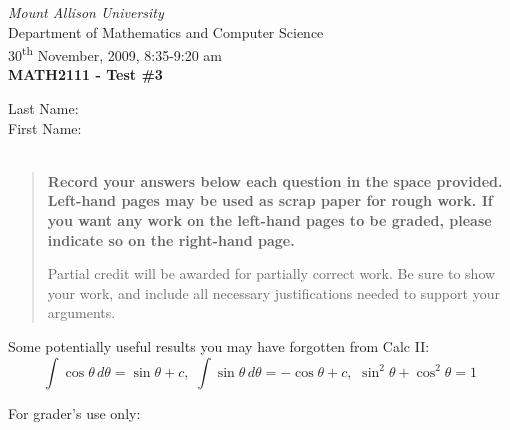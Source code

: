 \documentclass[12pt]{article}
\newcommand{\skipline}{\vspace{12pt}}
\begin{document}
\author{Sean Fitzpatrick}
\thispagestyle{plain}
\begin{center}
\emph{Mount Allison University}\\
Department of Mathematics and Computer Science\\
30\textsuperscript{th} November, 2009, 8:35-9:20 am\\
{\bf MATH2111 - Test \#3}\\
\end{center}
\skipline \skipline \skipline \noindent \skipline
Last Name:\underline{\hspace{350pt}}\\
\skipline
First Name:\underline{\hspace{348pt}}\\
\\

\vspace{2in}


\begin{quote}
 {\bf Record your answers below each question in the space provided.    Left-hand pages may be used as scrap paper for rough work.  If you want any work on the left-hand pages to be graded, please indicate so on the right-hand page.
 
 \bigskip
 
Partial credit will be awarded for partially correct work. Be sure to show your work, and include all necessary justifications needed to support your arguments.}
\end{quote}

\vspace{1in}
Some potentially useful results you may have forgotten from Calc II:
\[
 \int \cos\theta\,d\theta = \sin \theta +c,\,\, \int\sin\theta\,d\theta = -\cos\theta +c,\,\, \sin^2\theta+\cos^2\theta = 1
\]
\vspace{1in}

For grader's use only:
\end{document}
